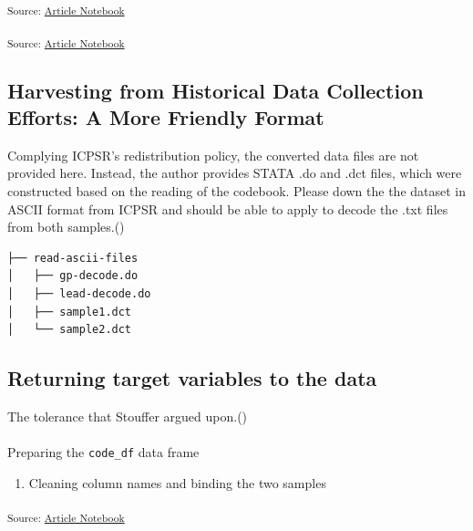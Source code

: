 \documentclass[
  letterpaper,
  DIV=11,
  numbers=noendperiod]{scrartcl}
\makeatletter
\let\oldparagraph\paragraph
\renewcommand{\paragraph}{
    \@ifstar
      \xxxParagraphStar
      \xxxParagraphNoStar
  }
\newcommand{\xxxParagraphStar}[1]{\oldparagraph*{#1}\mbox{}}
\newcommand{\xxxParagraphNoStar}[1]{\oldparagraph{#1}\mbox{}}
\providecommand{\tightlist}{%
  \setlength{\itemsep}{0pt}\setlength{\parskip}{0pt}}\usepackage{longtable,booktabs,array}
\makeatother
\begin{document}
\textsubscript{Source:
\href{https://h-christy.github.io/data-ethics-final/index.qmd.html}{Article
Notebook}}

\textsubscript{Source:
\href{https://h-christy.github.io/data-ethics-final/index.qmd.html}{Article
Notebook}}

\subsection{Harvesting from Historical Data Collection Efforts: A More
Friendly
Format}\label{harvesting-from-historical-data-collection-efforts-a-more-friendly-format}

Complying ICPSR's redistribution policy, the converted data files are
not provided here. Instead, the author provides STATA .do and .dct
files, which were constructed based on the reading of the codebook.
Please down the the dataset in ASCII format from ICPSR and should be
able to apply to decode the .txt files from both
samples.()

\begin{verbatim}
├── read-ascii-files
│   ├── gp-decode.do
│   ├── lead-decode.do
│   ├── sample1.dct
│   └── sample2.dct
\end{verbatim}

\subsection{Returning target variables to the
data}\label{returning-target-variables-to-the-data}

The tolerance that Stouffer argued
upon.()

\paragraph{\texorpdfstring{Preparing the \texttt{code\_df} data
frame}{Preparing the code\_df data frame}}\label{preparing-the-code_df-data-frame}

\begin{enumerate}
\def\labelenumi{\arabic{enumi}.}
\tightlist
\item
  Cleaning column names and binding the two samples
\end{enumerate}

\textsubscript{Source:
\href{https://h-christy.github.io/data-ethics-final/index.qmd.html}{Article
Notebook}}
\end{document}
